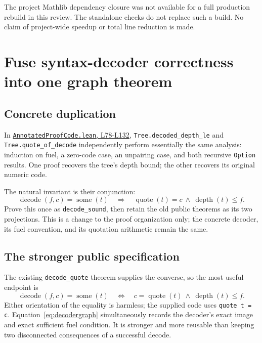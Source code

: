 \documentclass[11pt]{article}
\theoremstyle{remark}\newtheorem{remark}[theorem]{Remark}
\newcommand{\code}[1]{\nolinkurl{#1}}
\newcommand{\sref}[2]{\href{https://github.com/VladimirReshetnikov/ProveIt/blob/8e8b5dcb954969621c484588f0b902be1cfea7b3/Computability/DiophantineConsistency/Lean/DiophantineConsistency/#1\##2}{\nolinkurl{#1}, #2}}
\begin{document}
The project Mathlib dependency closure was not available for a full production rebuild in this review. The standalone checks do not replace such a build. No claim of project-wide speedup or total line reduction is made.

\section{Fuse syntax-decoder correctness into one graph theorem}
\label{sec:decoder}

\subsection{Concrete duplication}

In \sref{AnnotatedProofCode.lean}{L78-L132}, \code{Tree.decoded_depth_le} and \code{Tree.quote_of_decode} independently perform essentially the same analysis: induction on fuel, a zero-code case, an unpairing case, and both recursive \code{Option} results. One proof recovers the tree's depth bound; the other recovers its original numeric code.

The natural invariant is their conjunction:
\[
 \operatorname{decode}(f,c)=\operatorname{some}(t)
 \quad\Longrightarrow\quad
 \operatorname{quote}(t)=c\ \land\ \operatorname{depth}(t)\le f.
\]
Prove this once as \code{decode_sound}, then retain the old public theorems as its two projections. This is a change to the proof organization only; the concrete decoder, its fuel convention, and its quotation arithmetic remain the same.

\subsection{The stronger public specification}

The existing \code{decode_quote} theorem supplies the converse, so the most useful endpoint is
\begin{equation}
 \operatorname{decode}(f,c)=\operatorname{some}(t)
 \quad\Longleftrightarrow\quad
 c=\operatorname{quote}(t)\ \land\ \operatorname{depth}(t)\le f.
 \label{eq:decodergraph}
\end{equation}
Either orientation of the equality is harmless; the supplied code uses \code{quote t = c}. Equation~\eqref{eq:decodergraph} simultaneously records the decoder's exact image and exact sufficient fuel condition. It is stronger and more reusable than keeping two disconnected consequences of a successful decode.
\end{document}
